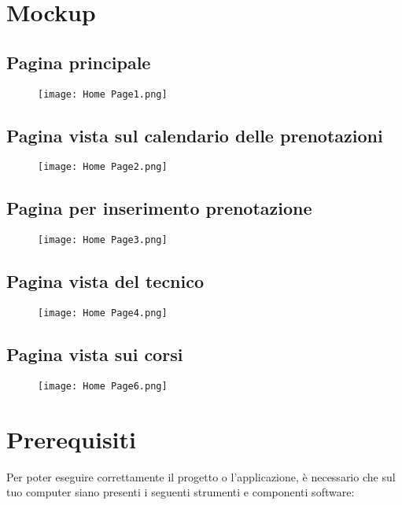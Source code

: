 \documentclass[11pt,a4paper]{report}
\begin{document}
\section{Mockup}
\subsection{Pagina principale}
\begin{figure}[h!]
  \centering
\texttt{[image: Home Page1.png]}
\end{figure}
\newpage

\subsection{Pagina vista sul calendario delle prenotazioni}
\begin{figure}[h!]
  \centering
\texttt{[image: Home Page2.png]}
\end{figure}

\newpage

\subsection{Pagina per inserimento prenotazione}
\begin{figure}[h!]
  \centering
\texttt{[image: Home Page3.png]}
\end{figure}
\newpage

\subsection{Pagina vista del tecnico}
\begin{figure}[h!]
  \centering
\texttt{[image: Home Page4.png]}
\end{figure}
\newpage

\subsection{Pagina vista sui corsi}
\begin{figure}[h!]
  \centering
\texttt{[image: Home Page6.png]}
\end{figure}
\newpage

\section{Prerequisiti}
Per poter eseguire correttamente il progetto o l'applicazione, è necessario che sul tuo computer siano presenti i seguenti strumenti 
e componenti software:
\end{document}

